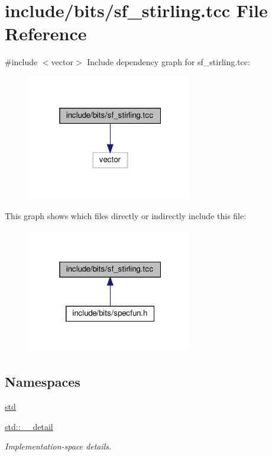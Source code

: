 \hypertarget{sf__stirling_8tcc}{}\section{include/bits/sf\+\_\+stirling.tcc File Reference}
\label{sf__stirling_8tcc}
{\ttfamily \#include $<$vector$>$}\newline
Include dependency graph for sf\+\_\+stirling.\+tcc\+:
\nopagebreak
\begin{figure}[H]
\begin{center}
\leavevmode
\includegraphics[width=208pt]{sf__stirling_8tcc__incl}
\end{center}
\end{figure}
This graph shows which files directly or indirectly include this file\+:
\nopagebreak
\begin{figure}[H]
\begin{center}
\leavevmode
\includegraphics[width=208pt]{sf__stirling_8tcc__dep__incl}
\end{center}
\end{figure}
\subsection*{Namespaces}
\begin{DoxyCompactItemize}
\item 
 \hyperlink{namespacestd}{std}
\item 
 \hyperlink{namespacestd_1_1____detail}{std\+::\+\_\+\+\_\+detail}
\begin{DoxyCompactList}\small\item\em Implementation-\/space details. \end{DoxyCompactList}\end{DoxyCompactItemize}
